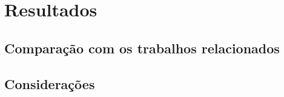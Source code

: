 \chapter{Resultados}
\label{c_resultados}

\section{Comparação com os trabalhos relacionados}
\label{sec:comparacao}

\section{Considerações}
\label{sec:}



















































































